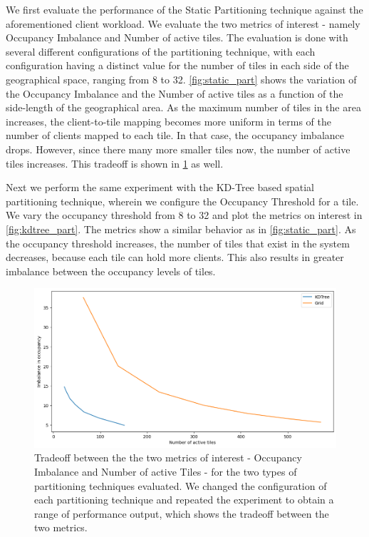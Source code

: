 We first evaluate the performance of the Static Partitioning technique against the aforementioned client workload. We evaluate the two metrics of interest - namely Occupancy Imbalance and Number of active tiles. The evaluation is done with several different configurations of the partitioning technique, with each configuration having a distinct value for the number of tiles in each side of the geographical space, ranging from 8 to 32. \cref{fig:static_part} shows the variation of the Occupancy Imbalance and the Number of active tiles as a function of the side-length of the geographical area. As the maximum number of tiles in the area increases, the client-to-tile mapping becomes more uniform in terms of the number of clients mapped to each tile. In that case, the occupancy imbalance drops. However, since there many more smaller tiles now, the number of active tiles increases. This tradeoff is shown in \cref{fig:spatial_tradeoff} as well.
\par Next we perform the same experiment with the KD-Tree based spatial partitioning technique, wherein we configure the Occupancy Threshold for a tile. We vary the occupancy threshold from 8 to 32 and plot the metrics on interest in \cref{fig:kdtree_part}. The metrics show a similar behavior as in \cref{fig:static_part}. As the occupancy threshold increases, the number of tiles that exist in the system decreases, because each tile can hold more clients. This also results in greater imbalance between the occupancy levels of tiles.

\begin{figure}
\centering
\includegraphics[width=0.75\linewidth]{figures/design_space/spatial/spatial_partitioning_tradeoff.png}
\caption{Tradeoff between the the two metrics of interest - Occupancy Imbalance and Number of active Tiles - for the two types of partitioning techniques evaluated. We changed the configuration of each partitioning technique and repeated the experiment to obtain a range of performance output, which shows the tradeoff between the two metrics.}
\label{fig:spatial_tradeoff}
\end{figure}

